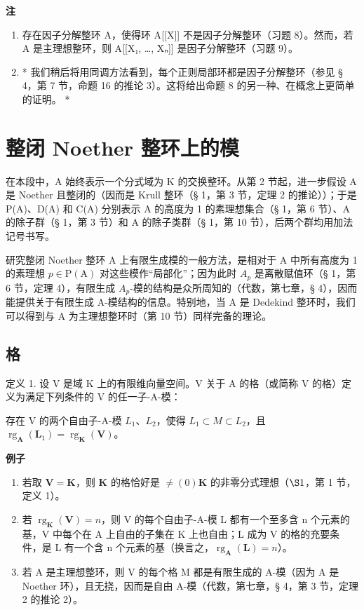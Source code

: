 \textbf{注}\par

\begin{enumerate}
\def\labelenumi{(\arabic{enumi})}
\item
  存在因子分解整环 A，使得环 A{[}{[}X{]}{]} 不是因子分解整环（习题 8）。然而，若 A 是主理想整环，则 A{[}{[}X₁, \ldots, Xₙ{]}{]} 是因子分解整环（习题 9）。
\item
  * 我们稍后将用同调方法看到，每个正则局部环都是因子分解整环（参见 § 4，第 7 节，命题 16 的推论 3）。这将给出命题 8 的另一种、在概念上更简单的证明。 *
\end{enumerate}

\section{整闭 Noether 整环上的模}

在本段中，A 始终表示一个分式域为 K 的交换整环。从第 2 节起，进一步假设 A 是 Noether 且整闭的（因而是 Krull 整环（§ 1，第 3 节，定理 2 的推论））；于是 P(A)、D(A) 和 C(A) 分别表示 A 的高度为 1 的素理想集合（§ 1，第 6 节）、A 的除子群（§ 1，第 3 节）和 A 的除子类群（§ 1，第 10 节），后两个群均用加法记号书写。

研究整闭 Noether 整环 A 上有限生成模的一般方法，是相对于 A 中所有高度为 1 的素理想 \(p \in \mathrm{P}(\mathrm{A})\) 对这些模作``局部化''；因为此时 \(A_{p}\) 是离散赋值环（§ 1，第 6 节，定理 4），有限生成 \(A_{p}\)-模的结构是众所周知的（代数，第七章，§ 4），因而能提供关于有限生成 A-模结构的信息。特别地，当 A 是 Dedekind 整环时，我们可以得到与 A 为主理想整环时（第 10 节）同样完备的理论。

\subsection{格}

定义 1. 设 V 是域 K 上的有限维向量空间。V 关于 A 的格（或简称 V 的格）定义为满足下列条件的 V 的任一子-A-模：

存在 V 的两个自由子-A-模 \(L_{1}\)、\(L_{2}\)，使得 \(L_{1} \subset M \subset L_{2}\)，且 \(\operatorname{rg}_{\mathbf{A}}(\mathbf{L}_{1}) = \operatorname{rg}_{\mathbf{K}}(\mathbf{V})\)。

\textbf{例子}\par

\begin{enumerate}
\def\labelenumi{(\arabic{enumi})}
\item
  若取 \(\mathbf{V} = \mathbf{K}\)，则 \(\mathbf{K}\) 的格恰好是 \(\neq (0)\)\(\mathbf{K}\) 的非零分式理想（\(\S 1\)，第 1 节，定义 1）。
\item
  若 \(\operatorname{rg}_{\mathbf{K}}(\mathbf{V}) = n\)，则 V 的每个自由子-A-模 L 都有一个至多含 n 个元素的基，V 中每个在 A 上自由的子集在 K 上也自由；L 成为 V 的格的充要条件，是 L 有一个含 n 个元素的基（换言之，\(\operatorname{rg}_{\mathbf{A}}(\mathbf{L}) = n\)）。
\item
  若 A 是主理想整环，则 V 的每个格 M 都是有限生成的 A-模（因为 A 是 Noether 环），且无挠，因而是自由 A-模（代数，第七章，§ 4，第 3 节，定理 2 的推论 2）。
\end{enumerate}

